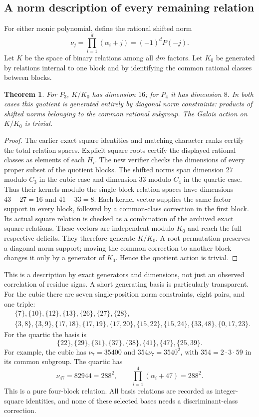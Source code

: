 \documentclass[11pt]{article}
\newtheorem{theorem}{Theorem}[section]
\theoremstyle{definition}\newtheorem{definition}[theorem]{Definition}
\begin{document}
\subsection{A norm description of every remaining relation}
For either monic polynomial, define the rational shifted norm
\[
 \nu_j=\prod_{i=1}^d(\alpha_i+j)=(-1)^dP(-j).
\]
Let $K$ be the space of binary relations among all $dm$ factors.
Let $K_0$ be generated by relations internal to one block and by
identifying the common rational classes between blocks.
\begin{theorem}\label{thm:norms}
For $P_3$, $K/K_0$ has dimension $16$; for $P_4$ it has dimension
$8$. In both cases this quotient is generated entirely by diagonal
norm constraints: products of shifted norms belonging to the
common rational subgroup. The Galois action on $K/K_0$ is trivial.
\end{theorem}
\begin{proof}
The earlier exact square identities and matching character ranks
certify the total relation spaces. Explicit square roots certify
the displayed rational classes as elements of each $H_i$.
The new verifier checks the dimensions of every proper subset
of the quotient blocks. The shifted norms span dimension $27$
modulo $C_3$ in the cubic case and dimension $33$ modulo $C_4$
in the quartic case. Thus their kernels modulo the single-block
relation spaces have dimensions $43-27=16$ and $41-33=8$.
Each kernel vector supplies the same factor support in every
block, followed by a common-class correction in the first block.
Its actual square relation is checked as a combination of the
archived exact square relations. These vectors are independent
modulo $K_0$ and reach the full respective deficits. They therefore
generate $K/K_0$. A root permutation preserves a diagonal norm
support; moving the common correction to another block changes
it only by a generator of $K_0$. Hence the quotient action is trivial.
\end{proof}
This is a description by exact generators and dimensions, not just
an observed correlation of residue signs. A short generating basis
is particularly transparent. For the cubic there are seven
single-position norm constraints, eight pairs, and one triple:
\[
\begin{split}
 &\{7\},\{10\},\{12\},\{13\},\{26\},\{27\},\{28\},\\
 &\{3,8\},\{3,9\},\{17,18\},\{17,19\},\{17,20\},
   \{15,22\},\{15,24\},\{33,48\},\{0,17,23\}.
\end{split}
\]
For the quartic the basis is
\[
 \{22\},\{29\},\{31\},\{37\},\{38\},\{41\},\{47\},\{25,39\}.
\]
For example, the cubic has
$\nu_7=35400$ and $354\nu_7=3540^2$, with
$354=2\cdot3\cdot59$ in its common subgroup. The quartic has
\[
 \nu_{47}=82944=288^2,
 \qquad\prod_{i=1}^4(\alpha_i+47)=288^2.
\]
This is a pure four-block relation. All basis relations are recorded
as integer-square identities, and none of these selected bases
needs a discriminant-class correction.
\end{document}
